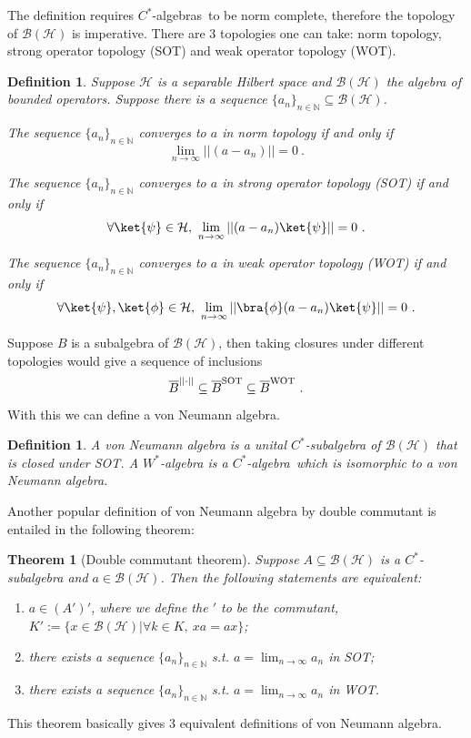 \documentclass[a4paper,11pt]{article}
\newtheorem{theorem}[lemma]{Theorem}
\newtheorem{defn}[lemma]{Definition}
\newcommand{\Ch}{\mathrm{Ch}}
\newcommand{\CH}{\Ch_{\mu_1\mu_2}(Q_F,{t},{q})}
\newcommand{\be}{\begin{equation}}
\newcommand{\ee}{\end{equation}}
\def\bbN{\mathbb{N}}
\def\CH{\mathcal{H}}
\def\calg{$C^*$-algebra\ }
\def\calgs{$C^*$-algebras\ }
\begin{document}
The definition requires \calgs to be norm complete, therefore the topology of $\mathscr{B}(\CH)$ is imperative. There are 3 topologies one can take: norm topology, strong operator topology (SOT) and weak operator topology (WOT).
\begin{defn}
    Suppose $\CH$ is a separable Hilbert space and $\mathscr{B}(\CH)$ the algebra of bounded operators. Suppose there is a sequence $\{a_n\}_{n\in \bbN}\subseteq \mathscr{B}(\CH)$.

    The sequence $\{a_n\}_{n\in \bbN}$ converges to $a$ in norm topology if and only if
    \be   \lim_{n\to \infty}||(a-a_n)|| = 0 \ .  \ee

    The sequence $\{a_n\}_{n\in \bbN}$ converges to $a$ in strong operator topology (SOT) if and only if
    \be  \forall \ket{\psi}\in \CH, \ \lim_{n\to \infty}||(a-a_n)\ket{\psi}|| = 0 \ .  \ee

    The sequence $\{a_n\}_{n\in \bbN}$ converges to $a$ in weak operator topology (WOT) if and only if
    \be  \forall \ket{\psi},\ket{\phi}\in \CH, \ \lim_{n\to \infty}||\bra{\phi}(a-a_n)\ket{\psi}|| = 0 \ .  \ee
\end{defn}
Suppose $B$ is a subalgebra of $\mathscr{B}(\CH)$, then taking closures under different topologies would give a sequence of inclusions
\be  \overline{B}^{||\cdot ||} \subseteq \overline{B}^{\rm SOT} \subseteq  \overline{B}^{\rm WOT}  \ . \ee
With this we can define a von Neumann algebra.
\begin{defn}
    A von Neumann algebra is a unital $C^*$-subalgebra of $\mathscr{B}(\CH)$ that is closed under SOT. A $W^*$-algebra is a \calg which is isomorphic to a von Neumann algebra.
\end{defn}
Another popular definition of von Neumann algebra by double commutant is entailed in the following theorem:
\begin{theorem}[Double commutant theorem]
    Suppose $A\subseteq \mathscr{B}(\CH)$ is a $C^*$-subalgebra and $a\in \mathscr{B}(\CH)$. Then the following statements are equivalent:
    \begin{enumerate}
        \item $a\in (A')'$, where we define the $'$ to be the commutant, $K' := \{x\in  \mathscr{B}(\CH)|\forall k\in K, \  xa =ax\} $;
        \item there exists a sequence $\{a_n\}_{n\in \bbN}$ s.t. $a = \lim_{n\to \infty} a_n$ in SOT;
        \item there exists a sequence $\{a_n\}_{n\in \bbN}$ s.t. $a = \lim_{n\to \infty} a_n$ in WOT.
    \end{enumerate}
\end{theorem}
This theorem basically gives 3 equivalent definitions of von Neumann algebra.
\end{document}

